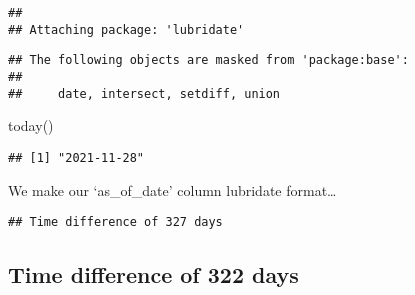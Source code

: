 \documentclass[
]{article}
\newenvironment{Shaded}{\begin{snugshade}}{\end{snugshade}}
\newcommand{\CommentTok}[1]{\textcolor[rgb]{0.56,0.35,0.01}{\textit{#1}}}
\newcommand{\DecValTok}[1]{\textcolor[rgb]{0.00,0.00,0.81}{#1}}
\newcommand{\FunctionTok}[1]{\textcolor[rgb]{0.00,0.00,0.00}{#1}}
\newcommand{\NormalTok}[1]{#1}
\newcommand{\OtherTok}[1]{\textcolor[rgb]{0.56,0.35,0.01}{#1}}
\newcommand{\SpecialCharTok}[1]{\textcolor[rgb]{0.00,0.00,0.00}{#1}}
\begin{document}
\begin{verbatim}
## 
## Attaching package: 'lubridate'
\end{verbatim}

\begin{verbatim}
## The following objects are masked from 'package:base':
## 
##     date, intersect, setdiff, union
\end{verbatim}

\begin{Shaded}
\begin{Highlighting}[]
\FunctionTok{today}\NormalTok{()}
\end{Highlighting}
\end{Shaded}

\begin{verbatim}
## [1] "2021-11-28"
\end{verbatim}

We make our `as\_of\_date' column lubridate format\ldots{}

\begin{Shaded}
\end{Shaded}

\begin{Shaded}
\end{Shaded}

\begin{verbatim}
## Time difference of 327 days
\end{verbatim}

\hypertarget{time-difference-of-322-days}{%
\subsection{Time difference of 322
days}\label{time-difference-of-322-days}}

\begin{Shaded}
\end{Shaded}
\end{document}
